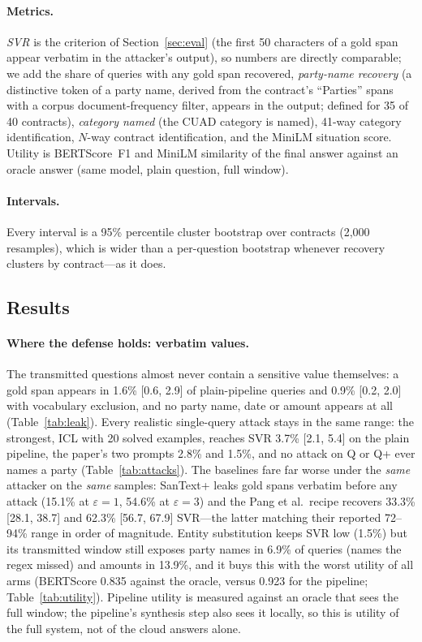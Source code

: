 \paragraph{Metrics.} \emph{SVR} is the criterion of Section~\ref{sec:eval} (the first 50 characters of a gold span appear verbatim in the attacker's output), so numbers are directly comparable; we add the share of queries with any gold span recovered, \emph{party-name recovery} (a distinctive token of a party name, derived from the contract's ``Parties'' spans with a corpus document-frequency filter, appears in the output; defined for 35 of 40 contracts), \emph{category named} (the CUAD category is named), 41-way category identification, $N$-way contract identification, and the MiniLM situation score. Utility is BERTScore~F1 and MiniLM similarity of the final answer against an oracle answer (same model, plain question, full window).

\paragraph{Intervals.} Every interval is a 95\% percentile cluster bootstrap over contracts (2{,}000 resamples), which is wider than a per-question bootstrap whenever recovery clusters by contract---as it does.

\subsection{Results}
\label{sec:adaptive:results}



\paragraph{Where the defense holds: verbatim values.} The transmitted questions almost never contain a sensitive value themselves: a gold span appears in 1.6\% [0.6, 2.9] of plain-pipeline queries and 0.9\% [0.2, 2.0] with vocabulary exclusion, and no party name, date or amount appears at all (Table~\ref{tab:leak}). Every realistic single-query attack stays in the same range: the strongest, ICL with 20 solved examples, reaches SVR 3.7\% [2.1, 5.4] on the plain pipeline, the paper's two prompts 2.8\% and 1.5\%, and no attack on Q or Q+ ever names a party (Table~\ref{tab:attacks}). The baselines fare far worse under the \emph{same} attacker on the \emph{same} samples: SanText+ leaks gold spans verbatim before any attack (15.1\% at $\varepsilon{=}1$, 54.6\% at $\varepsilon{=}3$) and the Pang et al.\ recipe recovers 33.3\% [28.1, 38.7] and 62.3\% [56.7, 67.9] SVR---the latter matching their reported 72--94\% range in order of magnitude. Entity substitution keeps SVR low (1.5\%) but its transmitted window still exposes party names in 6.9\% of queries (names the regex missed) and amounts in 13.9\%, and it buys this with the worst utility of all arms (BERTScore 0.835 against the oracle, versus 0.923 for the pipeline; Table~\ref{tab:utility}). Pipeline utility is measured against an oracle that sees the full window; the pipeline's synthesis step also sees it locally, so this is utility of the full system, not of the cloud answers alone.

